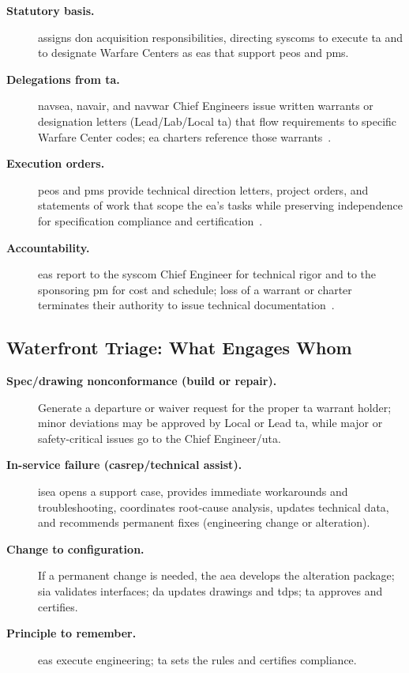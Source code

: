 \documentclass[../main.tex]{subfiles}
\begin{document}
\begin{description}
	\item[\textbf{Statutory basis.}] \autocite{SECNAV5400-15D} assigns \ac{don} acquisition responsibilities, directing \acp{syscom} to execute \ac{ta} and to designate Warfare Centers as \acp{ea} that support \acp{peo} and \acp{pm}.
	\item[\textbf{Delegations from \ac{ta}.}] \ac{navsea}, \ac{navair}, and \ac{navwar} Chief Engineers issue written warrants or designation letters (Lead/Lab/Local \ac{ta}) that flow requirements to specific Warfare Center codes; \ac{ea} charters reference those warrants~\autocite{edo-2-1-5-technical-authority-2025}.
	\item[\textbf{Execution orders.}]\acp{peo} and \acp{pm} provide technical direction letters, project orders, and statements of work that scope the \ac{ea}'s tasks while preserving independence for specification compliance and certification~\autocite{edo-2-1-4-warfare-centers-2024}.
	\item[\textbf{Accountability.}]\acp{ea} report to the \ac{syscom} Chief Engineer for technical rigor and to the sponsoring \ac{pm} for cost and schedule; loss of a warrant or charter terminates their authority to issue technical documentation~\autocite{edo-2-1-5-technical-authority-2025}.
\end{description}

\subsection{Waterfront Triage: What Engages Whom}
\begin{description}
	\item[\textbf{Spec/drawing nonconformance (build or repair).}] Generate a departure or waiver request for the proper \ac{ta} warrant holder; minor deviations may be approved by Local or Lead \ac{ta}, while major or safety-critical issues go to the Chief Engineer/\ac{uta}.
	\item[\textbf{In-service failure (\ac{casrep}/technical assist).}] \ac{isea} opens a support case, provides immediate workarounds and troubleshooting, coordinates root-cause analysis, updates technical data, and recommends permanent fixes (engineering change or alteration).
	\item[\textbf{Change to configuration.}] If a permanent change is needed, the \ac{aea} develops the alteration package; \ac{sia} validates interfaces; \ac{da} updates drawings and \acp{tdp}; \ac{ta} approves and certifies.
	\item[\textbf{Principle to remember.}]\acp{ea} execute engineering; \ac{ta} sets the rules and certifies compliance.
\end{description}
\end{document}
